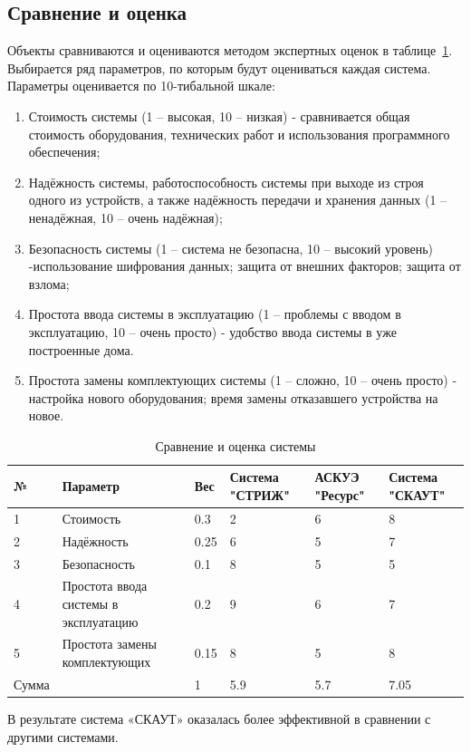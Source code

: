 \subsection{Сравнение и оценка}

Объекты сравниваются и оцениваются методом экспертных оценок в таблице~\ref{tab:tab3}. Выбирается ряд параметров, по которым будут оцениваться каждая система. Параметры оценивается по 10-тибальной шкале:
\begin{enumerate}
	\item Стоимость системы (1 – высокая, 10 – низкая) - сравнивается общая стоимость оборудования, технических работ и использования программного обеспечения;
	\item Надёжность системы, работоспособность системы при выходе из строя одного из устройств, а также надёжность передачи и хранения данных (1 – ненадёжная, 10 – очень надёжная);
	\item Безопасность системы (1 – система не безопасна, 10 – высокий уровень) -использование шифрования данных; защита от внешних факторов; защита от взлома; 
	\item Простота ввода системы в эксплуатацию (1 – проблемы с вводом в эксплуатацию, 10 – очень просто) - удобство ввода системы в уже построенные дома. 
	\item Простота замены комплектующих системы (1 – сложно, 10 – очень просто) - настройка нового оборудования; время замены отказавшего устройства на новое.
\end{enumerate}

\begin{table}[H]
	\caption{Сравнение и оценка системы} \label{tab:tab3}
	\centering
	\begin{tabular}{|p{1.4cm}|p{3cm}|p{1cm}|p{3cm}|p{3cm}|p{3cm}|}
		\hline 
		№ & Параметр & Вес & Система "СТРИЖ" & АСКУЭ "Ресурс" & Система "СКАУТ" \\ 
		\hline 
		1 & Стоимость & 0.3 & 2 & 6 & 8 \\ 
		\hline 
		2 & Надёжность & 0.25 & 6 & 5 & 7 \\ 
		\hline 
		3 & Безопасность & 0.1 & 8 & 5 & 5 \\ 
		\hline 
		4 & Простота ввода системы в эксплуатацию   & 0.2 & 9 & 6 & 7 \\ 
		\hline 
		5 & Простота замены комплектующих & 0.15 & 8 & 5 & 8 \\ 
		\hline 
		Сумма & & 1 & 5.9 & 5.7 & 7.05 \\ 
		\hline 
	\end{tabular} 
\end{table}
В результате система «СКАУТ» оказалась более эффективной в сравнении с другими системами. 